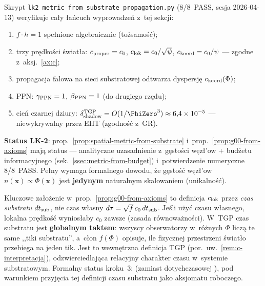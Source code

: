 \begin{remark}%
\label{rem:metric-bridge-numerical}
Skrypt \texttt{lk2\_metric\_from\_substrate\_propagation.py}
(8/8~PASS, sesja 2026-04-13) weryfikuje ca\l{}y \l{}a\'ncuch
wyprowadze\'n z~tej sekcji:
\begin{enumerate}[nosep]
  \item $f\cdot h = 1$ spe\l{}nione algebraicznie (to\.zsamo\'s\'c);
  \item trzy pr\k{e}dko\'sci \'swiat\l{}a: $c_{\rm proper} = c_0$,
    $c_{\rm lok} = c_0/\sqrt\psi$, $c_{\rm koord} = c_0/\psi$
    --- zgodne z~aksj.~\ref{ax:c};
  \item propagacja falowa na sieci substratowej odtwarza
    dyspersj\k{e} $c_{\rm koord}(\Phi)$;
  \item PPN: $\gamma_{\rm PPN} = 1$, $\beta_{\rm PPN} = 1$
    (do drugie\-go rz\k{e}du);
  \item cie\'n czarnej dziury:
    $\delta_{\rm shadow}^{\rm TGP} = O(1/\PhiZero^3)
    \approx 6{,}4 \times 10^{-5}$ --- niewykrywalny
    przez EHT (zgodno\'s\'c z~GR).
\end{enumerate}
\textbf{Status LK-2}: prop.~\ref{prop:spatial-metric-from-substrate}
i~prop.~\ref{prop:g00-from-axioms} maj\k{a} status
 --- analityczne
uzasadnienie z~g\k{e}sto\'sci w\k{e}z\l{}'ow + bud\.zetu
informacyjnego (sek.~\ref{ssec:metric-from-budget})
i~potwierdzenie numeryczne 8/8~PASS.
Pe\l{}ny  wymaga formalnego dowodu,
\.ze gęsto\'s\'c w\k{e}z\l{}'ow $n(\mathbf{x}) \propto \Phi(\mathbf{x})$
jest \textbf{jedynym} naturalnym skalowaniem (unikalno\'s\'c).
\end{remark}

\begin{remark}%
\label{rem:substrate-time}
Kluczowe za\l{}o\.zenie w~prop.~\ref{prop:g00-from-axioms} to
definicja $c_{\rm lok}$ przez \emph{czas substratu} $dt_{\rm sub}$,
nie czas w\l{}asny $d\tau = \sqrt{f}\,c_0\,dt_{\rm sub}$.
Je\'sli u\.zy\'c czasu w\l{}asnego, lokalna pr\k{e}dko\'s\'c
wynios\l{}aby $c_0$ zawsze (zasada r\'ownowa\.zno\'sci).
W~TGP czas substratu jest \textbf{globalnym taktem}:
wszyscy obserwatorzy w~r\'o\.znych $\Phi$ licz\k{a} te same
,,tiki substratu'', a~c\l{}on $f(\Phi)$ opisuje,
ile fizycznej przestrzeni \'swiat\l{}o przebiega na jeden tik.
Jest to wewn\k{e}trzna definicja TGP (por.\ uw.~\ref{rem:c-interpretacja}),
odzwierciedlaj\k{a}ca relacyjny charakter czasu w~systemie substratowym.
Formalny status kroku~3: 
(zamiast dotychczasowej ),
pod warunkiem przyj\k{e}cia tej definicji czasu substratu
jako aksjomatu roboczego.
\end{remark}

